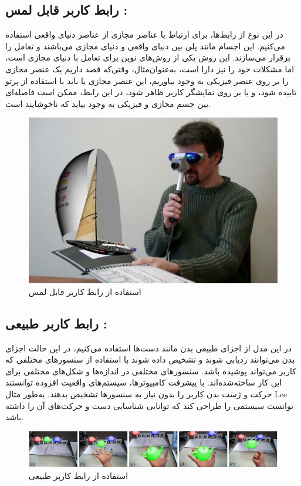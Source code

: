 \subsection{رابط کاربر قابل‌ لمس\protect{} :}
در این نوع از رابط‌ها، برای ارتباط با عناصر مجازی از عناصر دنیای واقعی استفاده می‌کنیم. این اجسام مانند پلی بین دنیای واقعی و دنیای مجازی می‌باشند و تعامل را برقرار می‌سازند. این روش یکی از روش‌های نوین برای تعامل با دنیای مجازی است، اما مشکلات خود را نیز دارا است، به‌عنوان‌مثال، وقتی‌که قصد داریم یک عنصر مجازی را بر روی عنصر فیزیکی به وجود بیاوریم، این عنصر مجازی یا باید با استفاده از پرتو تابیده شود، و یا بر روی نمایشگر کاربر ظاهر شود، در این رابط، ممکن است فاصله‌ای بین جسم مجازی و فیزیکی به وجود بیاید که ناخوشایند است\cite{Kato}.
\begin{figure}[tb]
	\centering
	\includegraphics[width=0.6\linewidth]{image/tar}
	\caption {استفاده از رابط کاربر قابل لمس \cite{Kato}}
	\label{fig:Bowman}
\end{figure}
\subsection{رابط کاربر طبیعی \protect{} :}
در این مدل از اجزای طبیعی بدن مانند دست‌ها استفاده می‌کنیم، در این حالت اجزای بدن می‌توانند ردیابی شوند و تشخیص داده شوند با استفاده از سنسورهای مختلفی که کاربر می‌تواند پوشیده باشد. سنسورهای مختلفی در اندازه‌ها و شکل‌های مختلفی برای این کار ساخته‌شده‌اند.
با پیشرفت کامپیوترها، سیستم‌های واقعیت افزوده توانستند حرکت و ژست بدن کاربر را بدون نیاز به سنسورها تشخیص بدهند. به‌طور مثال Lee توانست سیستمی را طراحی کند که توانایی شناسایی دست و حرکت‌های آن را داشته باشد\cite{Lee}.
\begin{figure}[!ht]
	\centering
	\includegraphics[width=1\linewidth]{image/handyar}
	\caption {استفاده از رابط کاربر طبیعی \cite{Lee}}
	\label{fig:Bowman}
\end{figure}

